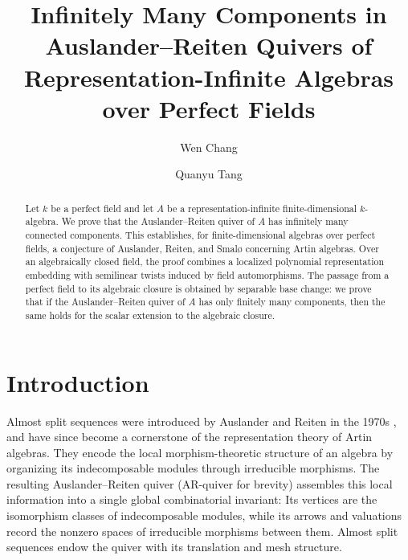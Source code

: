 \documentclass[11pt,letterpaper,reqno]{amsart}
\theoremstyle{definition}
\begin{document}
\title[Components of Auslander--Reiten Quivers]
{Infinitely Many Components in Auslander--Reiten Quivers of Representation-Infinite Algebras over Perfect Fields}

\author[W.~Chang]{Wen Chang}
\address{School of Mathematics and Statistics, Shaanxi Normal University, Xi'an 710062, P.~R.~China}

\author[Q.~Tang]{Quanyu Tang}
\address{School of Mathematical Sciences, University of Science and Technology of China, Hefei 230026, P.~R.~China}



\begin{abstract}
Let $k$ be a perfect field and let $A$ be a representation-infinite
finite-dimensional $k$-algebra.  We prove that the Auslander--Reiten quiver of $A$ has infinitely many connected components. This establishes, for finite-dimensional algebras over perfect fields, a conjecture of Auslander, Reiten, and Smal\o{} concerning Artin algebras.  Over an
algebraically closed field, the proof combines a localized polynomial
representation embedding with semilinear twists induced by field
automorphisms. 
The passage from a perfect field to its algebraic closure is obtained by separable base change: we prove that if the Auslander--Reiten quiver of $A$ has only finitely many components, then the same holds for the scalar extension to the algebraic closure. 
\end{abstract}

\maketitle

\section{Introduction}\label{sec:introduction}
Almost split sequences were introduced by Auslander and Reiten
in the 1970s \cite{AR75}, and have since become a cornerstone
of the representation theory of Artin algebras.  They encode
the local morphism-theoretic structure of an algebra by
organizing its indecomposable modules through irreducible
morphisms.  The resulting Auslander--Reiten quiver (AR-quiver for brevity)
assembles this local information into a single global
combinatorial invariant: Its vertices are the isomorphism classes of indecomposable modules, while its arrows and valuations record the nonzero spaces of irreducible morphisms between them. Almost split sequences endow the quiver with its translation and mesh structure.
\end{document}
